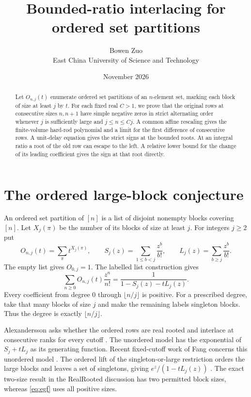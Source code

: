 \documentclass[11pt]{article}
\title{Bounded-ratio interlacing for ordered set partitions}
\author{Bowen Zuo\\[2pt]\small East China University of Science and Technology}
\date{November 2026}
\begin{document}
\maketitle
\begin{abstract}
Let \(O_{n,j}(t)\) enumerate ordered set partitions of an \(n\)-element set, marking each block of size at least \(j\) by \(t\). For each fixed real \(C>1\), we prove that the original rows at consecutive sizes \(n,n+1\) have simple negative zeros in strict alternating order whenever \(j\) is sufficiently large and \(j\le n\le Cj\). A common affine rescaling gives the finite-volume hard-rod polynomial and a limit for the first difference of consecutive rows. A unit-delay equation gives the strict signs at the bounded roots. At an integral ratio a root of the old row can escape to the left. A relative lower bound for the change of its leading coefficient gives the sign at that root directly.
\end{abstract}

\section{The ordered large-block conjecture}

An ordered set partition of \([n]\) is a list of disjoint nonempty blocks covering \([n]\). Let \(X_j(\pi)\) be the number of its blocks of size at least \(j\). For integers \(j\ge2\) put
\[
 O_{n,j}(t)=\sum_{\pi}t^{X_j(\pi)},\qquad
 S_j(z)=\sum_{1\le b<j}\frac{z^b}{b!},\qquad
 L_j(z)=\sum_{b\ge j}\frac{z^b}{b!}.
\]
The empty list gives \(O_{0,j}=1\). The labelled list construction gives
\begin{equation}\label{eq:egf}
 \sum_{n\ge0} O_{n,j}(t)\frac{z^n}{n!}
 =\frac{1}{1-S_j(z)-t L_j(z)} .
\end{equation}
Every coefficient from degree \(0\) through \(\lfloor n/j\rfloor\) is positive. For a prescribed degree, take that many blocks of size \(j\) and make the remaining labels singleton blocks. Thus the degree is exactly \(\lfloor n/j\rfloor\).

Alexandersson asks whether the ordered rows are real rooted and interlace at consecutive ranks for every cutoff \cite{alex}. The unordered model has the exponential of \(S_j+tL_j\) as its generating function. Recent fixed-cutoff work of Fang concerns this unordered model \cite[Theorem~1]{fang}. The ordered lift of the singleton-or-large restriction orders the large blocks and leaves a set of singletons, giving \(e^z/(1-tL_j(z))\) \cite{lift}. The exact two-size result in the RealRooted discussion \cite{rr} has two permitted block sizes, whereas \eqref{eq:egf} uses all positive sizes.
\end{document}
